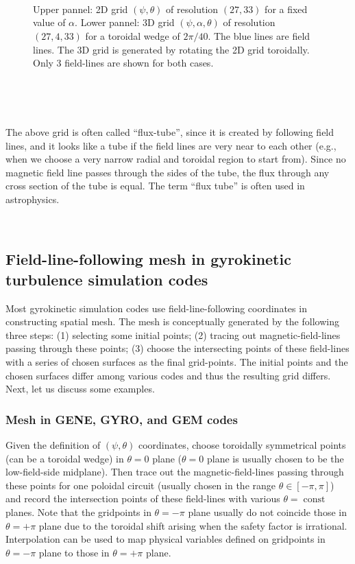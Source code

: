 \documentclass{llncs}
\newcommand{\tmop}[1]{\ensuremath{\operatorname{#1}}}
\begin{document}
\

\

\begin{figure}[h]
  
  \
  
  \caption{Upper pannel: 2D grid $(\psi, \theta)$ of resolution $(27, 33)$ for
  a fixed value of $\alpha$. Lower pannel: 3D grid $(\psi, \alpha, \theta)$ of
  resolution $(27, 4, 33)$ for a toroidal wedge of $2 \pi / 40$. The blue
  lines are field lines. The 3D grid is generated by rotating the 2D grid
  toroidally. Only 3 field-lines are shown for both cases.}
\end{figure}

\

\

The above grid is often called ``flux-tube'', since it is created by
following field lines, and it looks like a tube if the field lines are very
near to each other (e.g., when we choose a very narrow radial and toroidal
region to start from). Since no magnetic field line passes through the sides
of the tube, the flux through any cross section of the tube is equal. The term
``flux tube'' is often used in astrophysics.

\

\subsection{Field-line-following mesh in gyrokinetic turbulence simulation
codes}

Most gyrokinetic simulation codes use field-line-following coordinates in
constructing spatial mesh. The mesh is conceptually generated by the following
three steps: (1) selecting some initial points; (2) tracing out
magnetic-field-lines passing through these points; (3) choose the intersecting
points of these field-lines with a series of chosen surfaces as the final
grid-points. The initial points and the chosen surfaces differ among various
codes and thus the resulting grid differs. Next, let us discuss some examples.

\subsubsection{Mesh in GENE, GYRO, and GEM codes}

Given the definition of $(\psi, \theta)$ coordinates, choose toroidally
symmetrical points (can be a toroidal wedge) in $\theta = 0$ plane ($\theta =
0$ plane is usually chosen to be the low-field-side midplane). Then trace out
the magnetic-field-lines passing through these points for one poloidal circuit
(usually chosen in the range $\theta \in [- \pi, \pi]$) and record the
intersection points of these field-lines with various $\theta = \tmop{const}$
planes. Note that the gridpoints in $\theta = - \pi$ plane usually do not
coincide those in $\theta = + \pi$ plane due to the toroidal shift arising
when the safety factor is irrational. Interpolation can be used to map
physical variables defined on gridpoints in $\theta = - \pi$ plane to those in
$\theta = + \pi$ plane.
\end{document}
